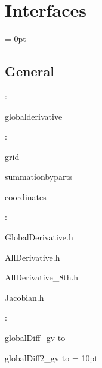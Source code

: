 
\section{Interfaces} 


\parskip = 0pt

\vspace{3mm} \subsection*{General}

: 

globalderivative
\vspace{2mm}

: 

grid

summationbyparts

coordinates
\vspace{2mm}

\vspace{5mm}

: 



GlobalDerivative.h

AllDerivative.h

AllDerivative\_8th.h

Jacobian.h
\vspace{2mm}

: 



globalDiff\_gv to 

globalDiff2\_gv to 
\vspace{2mm}\parskip = 10pt 

